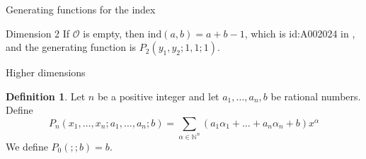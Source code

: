 \documentclass[reqno,a4paper,10pt]{amsart}
\theoremstyle{definition}
\newtheorem{definition}{Definition}
\theoremstyle{remark}
\theoremstyle{plain}
\newcommand{\Nat}{{\mathbb{N}}}
\newcommand{\ind}{\mathrm{ind}}
\begin{document}
\begin{section}{Generating functions for the index}
\begin{subsection}{Dimension 2}
  If \(\mathcal{O}\) is empty, then \(\ind(a,b)=a+b-1\), which is 
  id:A002024 in \cite{OEIS},
  and the
  generating function is \(P_2(y_1,y_2;1,1;1)\). 


\end{subsection}
\begin{subsection}{Higher dimensions}

  \begin{definition}\label{def:P}
    Let \(n\) be a positive integer and let \(a_1,\dots,a_n,b\) be
    rational numbers. Define 
    \begin{equation}
      \label{eq:P}
      P_n(x_1,\dots,x_n;a_1,\dots,a_n;b) = \sum_{\alpha \in \Nat^n}
      (a_1\alpha_1 +\dots + a_n \alpha_n + b) x^\alpha 
    \end{equation}
    We define \(P_0(;;b) = b\).
  \end{definition}



\end{subsection}
\end{section}
\end{document}

